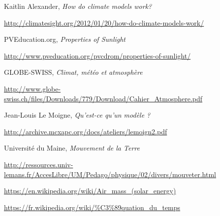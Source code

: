 \documentclass[12pt]{article}
\begin{document}
\begin{thebibliography}{9}

Kaitlin Alexander, \textit{How do climate models work?}

\url{http://climatesight.org/2012/01/20/how-do-climate-models-work/}


PVEducation.org, \textit{Properties of Sunlight}

\url{http://www.pveducation.org/pvcdrom/properties-of-sunlight/}


GLOBE-SWISS, \textit{Climat, météo et atmosphère}

\url{http://www.globe-swiss.ch/files/Downloads/779/Download/Cahier_Atmosphere.pdf}


Jean-Louis Le Moigne, \textit{Qu'est-ce qu'un modèle ?}

\url{http://archive.mcxapc.org/docs/ateliers/lemoign2.pdf}


Université du Maine, \textit{Mouvement de la Terre}

\url{http://ressources.univ-lemans.fr/AccesLibre/UM/Pedago/physique/02/divers/mouveter.html}



\url{https://en.wikipedia.org/wiki/Air_mass_(solar_energy)}



\url{https://fr.wikipedia.org/wiki/%C3%89quation_du_temps}

\end{thebibliography}
\end{document}
